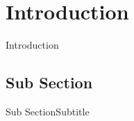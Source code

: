 \section{Introduction} 


\begin{frame}{Introduction}
   
\end{frame}



\subsection{Sub Section}
\begin{frame}{Sub Section}{Subtitle}

\end{frame}


